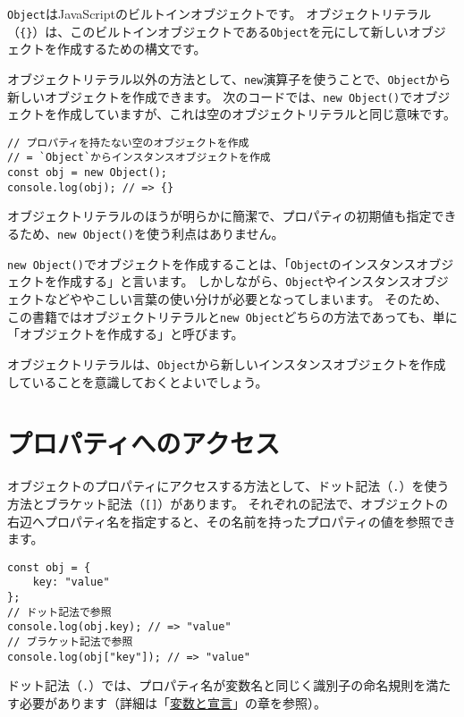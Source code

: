 \texttt{Object}はJavaScriptのビルトインオブジェクトです。
オブジェクトリテラル（\texttt{\{\}}）は、このビルトインオブジェクトである\texttt{Object}を元にして新しいオブジェクトを作成するための構文です。

オブジェクトリテラル以外の方法として、\texttt{new}演算子を使うことで、\texttt{Object}から新しいオブジェクトを作成できます。
次のコードでは、\texttt{new Object()}でオブジェクトを作成していますが、これは空のオブジェクトリテラルと同じ意味です。

\begin{lstlisting}
// プロパティを持たない空のオブジェクトを作成
// = `Object`からインスタンスオブジェクトを作成
const obj = new Object();
console.log(obj); // => {}
\end{lstlisting}

オブジェクトリテラルのほうが明らかに簡潔で、プロパティの初期値も指定できるため、\texttt{new Object()}を使う利点はありません。

\texttt{new Object()}でオブジェクトを作成することは、「\texttt{Object}のインスタンスオブジェクトを作成する」と言います。
しかしながら、\texttt{Object}やインスタンスオブジェクトなどややこしい言葉の使い分けが必要となってしまいます。
そのため、この書籍ではオブジェクトリテラルと\texttt{new Object}どちらの方法であっても、単に「オブジェクトを作成する」と呼びます。

オブジェクトリテラルは、\texttt{Object}から新しいインスタンスオブジェクトを作成していることを意識しておくとよいでしょう。

\hypertarget{property-access}{%
\section{プロパティへのアクセス}\label{property-access}}

オブジェクトのプロパティにアクセスする方法として、ドット記法（\texttt{.}）を使う方法とブラケット記法（\texttt{[]}）があります。
それぞれの記法で、オブジェクトの右辺へプロパティ名を指定すると、その名前を持ったプロパティの値を参照できます。

\begin{lstlisting}
const obj = {
    key: "value"
};
// ドット記法で参照
console.log(obj.key); // => "value"
// ブラケット記法で参照
console.log(obj["key"]); // => "value"
\end{lstlisting}

ドット記法（\texttt{.}）では、プロパティ名が変数名と同じく識別子の命名規則を満たす必要があります（詳細は「\href{../variables/README.md}{変数と宣言}」の章を参照）。

